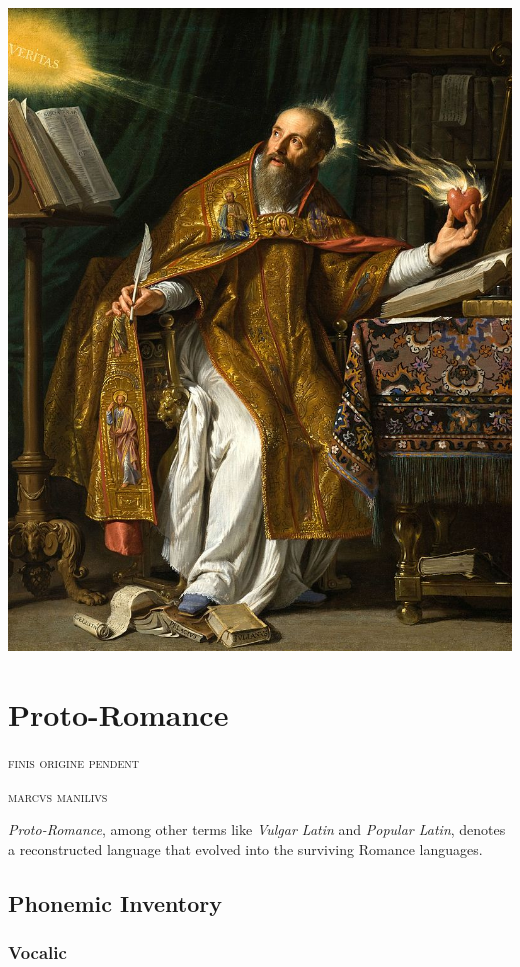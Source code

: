 \documentclass{report}[12pt]
\begin{document}
\includegraphics[scale=0.5]{augustine.jpg}

\thispagestyle{empty}

\pagebreak

\chapter{Proto-Romance}

\epigraph{\textsc{finis origine pendent}}{\textsc{marcvs manilivs}}

\emph{Proto-Romance}, among other terms like \emph{Vulgar Latin} and \emph{Popular Latin}, denotes a reconstructed language that evolved into the surviving Romance languages. 

\section{Phonemic Inventory}

\subsection{Vocalic}
\end{document}

